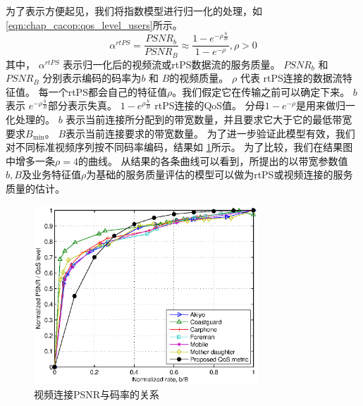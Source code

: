 \begin{enumerate}[(1)]
为了表示方便起见，我们将指数模型进行归一化的处理，如
\eqref{eqn:chap_cacop:qos_level_users}所示。
\begin{equation}
\alpha^{rtPS} = \frac{PSNR_b}{PSNR_B} \approx \frac{1- e^{-\rho \frac{b}{B} }}{1-e^{-\rho}}, \rho > 0
\label{eqn:chap_cacop:qos_level_users}
\end{equation}
其中，
$\alpha^{rtPS}$ 表示归一化后的视频流或rtPS数据流的服务质量。
$PSNR_b$ 和 $PSNR_B$ 分别表示编码的码率为$b$ 和 $B$的视频质量。
$\rho$ 代表 rtPS连接的数据流特征值。
每一个rtPS都会自己的特征值$\rho$。我们假定它在传输之前可以确定下来。
$b$表示
$e^{-\rho \frac{b}{B}}$部分表示失真。
$1- e^{\rho \frac{b}{B}}$ rtPS连接的QoS值。
分母$1-e^{-\rho}$是用来做归一化处理的。
$b$ 表示当前连接所分配到的带宽数量，并且要求它大于它的最低带宽要求$B_{\min}$。
$B$表示当前连接要求的带宽数量。
为了进一步验证此模型有效，我们对不同标准视频序列按不同码率编码，结果如 \ref{fig:chap_cacop:qos_rate_cac}所示。
为了比较，我们在结果图中增多一条$\rho=4$的曲线。
从结果的各条曲线可以看到，所提出的以带宽参数值$b,B$及业务特征值$\rho$为基础的服务质量评估的模型可以做为rtPS或视频连接的服务质量的估计。
\begin{figure}[tb]
\begin{center}
\includegraphics[width=0.75\textwidth] {cacop_qos_rate_cac.eps}
\end{center}
\caption{视频连接PSNR与码率的关系} 
\label{fig:chap_cacop:qos_rate_cac}
\end{figure}


\end{enumerate}
